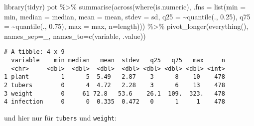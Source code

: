 \documentclass[
  letterpaper,
  DIV=11,
  numbers=noendperiod]{scrartcl}
\newenvironment{Shaded}{\begin{snugshade}}{\end{snugshade}}
\newcommand{\AttributeTok}[1]{\textcolor[rgb]{0.40,0.45,0.13}{#1}}
\newcommand{\FloatTok}[1]{\textcolor[rgb]{0.68,0.00,0.00}{#1}}
\newcommand{\FunctionTok}[1]{\textcolor[rgb]{0.28,0.35,0.67}{#1}}
\newcommand{\NormalTok}[1]{\textcolor[rgb]{0.00,0.23,0.31}{#1}}
\newcommand{\SpecialCharTok}[1]{\textcolor[rgb]{0.37,0.37,0.37}{#1}}
\newcommand{\StringTok}[1]{\textcolor[rgb]{0.13,0.47,0.30}{#1}}
\begin{document}
\begin{Shaded}
\begin{Highlighting}[]
\FunctionTok{library}\NormalTok{(tidyr)}
\NormalTok{pot }\SpecialCharTok{\%\textgreater{}\%} \FunctionTok{summarise}\NormalTok{(}\FunctionTok{across}\NormalTok{(}\FunctionTok{where}\NormalTok{(is.numeric), }\AttributeTok{.fns =} 
                     \FunctionTok{list}\NormalTok{(}\AttributeTok{min =}\NormalTok{ min,}
                          \AttributeTok{median =}\NormalTok{ median,}
                          \AttributeTok{mean =}\NormalTok{ mean,}
                          \AttributeTok{stdev =}\NormalTok{ sd,}
                          \AttributeTok{q25 =} \SpecialCharTok{\textasciitilde{}}\FunctionTok{quantile}\NormalTok{(., }\FloatTok{0.25}\NormalTok{),}
                          \AttributeTok{q75 =} \SpecialCharTok{\textasciitilde{}}\FunctionTok{quantile}\NormalTok{(., }\FloatTok{0.75}\NormalTok{),}
                          \AttributeTok{max =}\NormalTok{ max, }
                          \AttributeTok{n=}\NormalTok{length))) }\SpecialCharTok{\%\textgreater{}\%}
  \FunctionTok{pivot\_longer}\NormalTok{(}\FunctionTok{everything}\NormalTok{(), }\AttributeTok{names\_sep=}\StringTok{\textquotesingle{}\_\textquotesingle{}}\NormalTok{, }\AttributeTok{names\_to=}\FunctionTok{c}\NormalTok{(}\StringTok{\textquotesingle{}variable\textquotesingle{}}\NormalTok{, }\StringTok{\textquotesingle{}.value\textquotesingle{}}\NormalTok{))}
\end{Highlighting}
\end{Shaded}

\begin{verbatim}
# A tibble: 4 x 9
  variable    min median   mean  stdev   q25   q75   max     n
  <chr>     <dbl>  <dbl>  <dbl>  <dbl> <dbl> <dbl> <dbl> <int>
1 plant         1      5  5.49   2.87    3      8    10    478
2 tubers        0      4  4.72   2.28    3      6    13    478
3 weight        0     61 72.8   53.6    26.1  109.  323.   478
4 infection     0      0  0.335  0.472   0      1     1    478
\end{verbatim}

und hier nur für \texttt{tubers} und \texttt{weight}:
\end{document}
